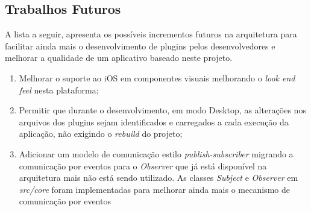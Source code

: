 \subsection{Trabalhos Futuros}
A lista a seguir, apresenta os possíveis incrementos futuros na arquitetura para facilitar ainda mais o desenvolvimento de plugins pelos desenvolvedores e melhorar a qualidade de um aplicativo baseado neste projeto.

\begin{enumerate}
	\item Melhorar o suporte ao iOS em componentes visuais melhorando o \textit{look end feel} nesta plataforma;

	\item Permitir que durante o desenvolvimento, em modo Desktop, as alterações nos arquivos dos plugins sejam identificados e carregados a cada execução da aplicação, não exigindo o \textit{rebuild} do projeto;

	\item Adicionar um modelo de comunicação estilo \textit{publish-subscriber} migrando a comunicação por eventos para o \textit{Observer} que já está disponível na arquitetura mais não está sendo utilizado. As classes \textit{Subject} e \textit{Observer} em \textit{src/core} foram implementadas para melhorar ainda mais o mecanismo de comunicação por eventos
\end{enumerate}